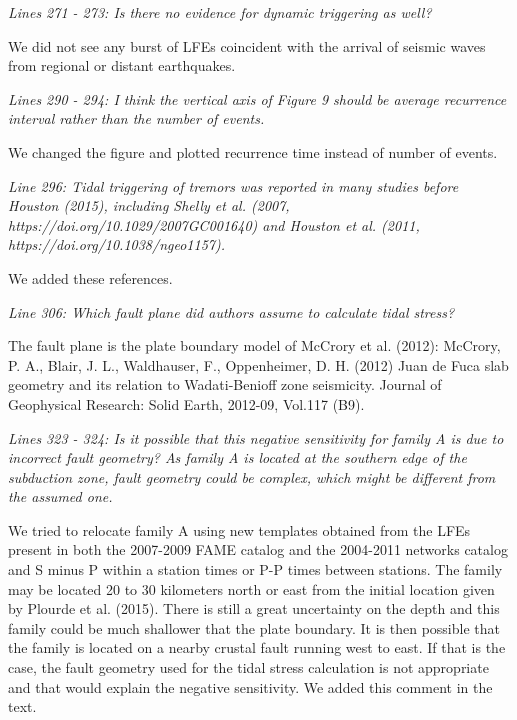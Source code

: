 \documentclass[letterpaper, 12pt]{article}
\begin{document}
\bigskip

\textit{Lines 271 - 273: Is there no evidence for dynamic triggering as well?}

\bigskip

We did not see any burst of LFEs coincident with the arrival of seismic waves from regional or distant earthquakes.

\bigskip

\textit{Lines 290 - 294: I think the vertical axis of Figure 9 should be average recurrence interval rather than the number of events.}

\bigskip

We changed the figure and plotted recurrence time instead of number of events.

\bigskip

\textit{Line 296: Tidal triggering of tremors was reported in many studies before Houston (2015), including Shelly et al. (2007, https://doi.org/10.1029/2007GC001640) and Houston et al. (2011, https://doi.org/10.1038/ngeo1157).}

\bigskip

We added these references.

\bigskip

\textit{Line 306: Which fault plane did authors assume to calculate tidal stress?}

\bigskip

The fault plane is the plate boundary model of McCrory et al. (2012): McCrory, P. A., Blair, J. L., Waldhauser, F., Oppenheimer, D. H. (2012) Juan de Fuca slab geometry and its relation to Wadati-Benioff zone seismicity. 
Journal of Geophysical Research: Solid Earth, 2012-09, Vol.117 (B9).

\bigskip

\textit{Lines 323 - 324: Is it possible that this negative sensitivity for family A is due to incorrect fault geometry? As family A is located at the southern edge of the subduction zone, fault geometry could be complex, which might be different from the assumed one.}

\bigskip

We tried to relocate family A using new templates obtained from the LFEs present in both the 2007-2009 FAME catalog and the 2004-2011 networks catalog and S minus P within a station times or P-P times between stations. The family may be located 20 to 30 kilometers north or east from the initial location given by Plourde et al. (2015). There is still a great uncertainty on the depth and this family could be much shallower that the plate boundary. It is then possible that the family is located on a nearby crustal fault running west to east. If that is the case, the fault geometry used for the tidal stress calculation is not appropriate and that would explain the negative sensitivity. We added this comment in the text.
\end{document}
